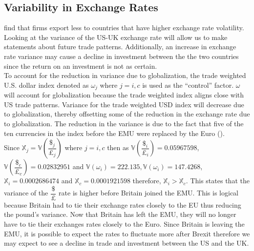 \documentclass[12pt]{article}
\begin{document}
\subsection{Variability in Exchange Rates}\label{variance}
\citet{heriponc:2015} find that firms export less to countries that have higher exchange rate volatility. Looking at the variance of the US-UK exchange rate will allow us to make statements about future trade patterns. Additionally, an increase in exchange rate variance may cause a decline in investment between the the two countries since the return on an investment is not as certain.\\

To account for the reduction in variance due to globalization, the trade weighted U.S. dollar index denoted as $\omega_j$ where $j = i,c$ is used as the  ``control'' factor. $\omega$ will account for globalization because the trade weighted index aligns close with US trade patterns. Variance for the trade weighted USD index will decrease due to globalization, thereby offsetting some of the reduction in the exchange rate due to globalization. The reduction in the variance is due to the fact that five of the ten currencies in the index before the EMU were replaced by the Euro (\citet{loretan:2005}).\\

Since $\mathbb{X}_{j} = \mathbb{V}\left(\dfrac{\$_{j}}{\pounds_{j}}\right)$ where $j = i,c$ then as $\mathbb{V}\left(\dfrac{\$_{i}}{\pounds_{i}}\right) = \num{0.05967598}$, $\mathbb{V}\left(\dfrac{\$_{c}}{\pounds_{c}}\right) = \num{0.02832951}$ and $\mathbb{V}(\omega_i) = \num{222.135}, \mathbb{V}(\omega_i) = \num{147.4268}$, $\mathbb{X}_{i} = \num{0.0002686474}$ and $\mathbb{X}_{c} = \num{0.0001921598}$ therefore, $\mathbb{X}_{i} > \mathbb{X}_{c}$. This states that the variance of the $\dfrac{\$}{\pounds}$ rate is higher before Britain joined the EMU. This is logical because Britain had to tie their exchange rates closely to the EU thus reducing the pound's variance. Now that Britain has left the EMU, they will no longer have to tie their exchanges rates closely to the Euro. Since Britain is leaving the EMU, it is possible to expect the rates to fluctuate more after Brexit therefore we may expect to see a decline in trade and investment between the US and the UK. 
\end{document}
